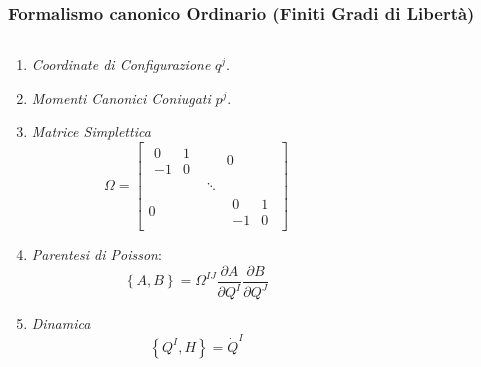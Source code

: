 \documentclass[8pt,handout]{beamer}
\begin{document}
	\begin{frame}	%
		\frametitle{Formalismo canonico Ordinario (Finiti Gradi di Libertà)}
  			\begin{columns}[T]
    			\begin{column}{.5\textwidth}
						\begin{enumerate}
							\item\emph{Coordinate di Configurazione} $q^j$.
							\item\emph{Momenti Canonici Coniugati}  $p^j$.
							\item \emph{Matrice Simplettica} 
								\begin{displaymath}
									\Omega=\begin{bmatrix}
										\begin{matrix}0 & 1\\ -1 & 0\end{matrix} & & 0 \\
											 & \ddots & \\
											 0 & & \begin{matrix}0 & 1 \\ -1 & 0
										\end{matrix}
									\end{bmatrix}
								\end{displaymath}
							\item \emph{Parentesi di Poisson}: 
								\begin{displaymath}
									\left\{A , B \right\} = \Omega^{I J} \frac{\partial A}{\partial Q^I} \frac{\partial B}{\partial Q^J}					
								\end{displaymath}
							\item \emph{Dinamica}
								\begin{displaymath}
									\left\{Q^I, H \right\} = \dot{Q}^I
								\end{displaymath}
							
								
								
						\end{enumerate}
    			\end{column}
    		   	\begin{column}{.5\textwidth}
					\parbox[c][.7\textheight][c]{\columnwidth}{%
 
  					}	
    			\end{column}
  			\end{columns}	
		\end{frame}
\end{document}
